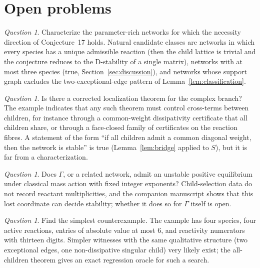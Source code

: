 \documentclass[11pt,a4paper]{article}
\theoremstyle{definition}
\theoremstyle{remark}
\newtheorem{question}[theorem]{Question}
\begin{document}
\section{Open problems}\label{sec:open}

\begin{question}
Characterize the parameter-rich networks for which the necessity direction of Conjecture~17 holds. Natural candidate classes are networks in which every species has a unique admissible reaction (then the child lattice is trivial and the conjecture reduces to the D-stability of a single matrix), networks with at most three species (true, Section~\ref{sec:discussion}), and networks whose support graph excludes the two-exceptional-edge pattern of Lemma~\ref{lem:classification}.
\end{question}

\begin{question}
Is there a corrected localization theorem for the complex branch? The example indicates that any such theorem must control cross-terms between children, for instance through a common-weight dissipativity certificate that all children share, or through a face-closed family of certificates on the reaction fibres. A statement of the form ``if all children admit a common diagonal weight, then the network is stable'' is true (Lemma~\ref{lem:bridge} applied to $S$), but it is far from a characterization.
\end{question}

\begin{question}
Does $\Gamma$, or a related network, admit an unstable positive equilibrium under classical mass action with fixed integer exponents? Child-selection data do not record reactant multiplicities, and the companion manuscript \cite{Companion2026} shows that this lost coordinate can decide stability; whether it does so for $\Gamma$ itself is open.
\end{question}

\begin{question}
Find the simplest counterexample. The example has four species, four active reactions, entries of absolute value at most $6$, and reactivity numerators with thirteen digits. Simpler witnesses with the same qualitative structure (two exceptional edges, one non-dissipative singular child) very likely exist; the all-children theorem gives an exact regression oracle for such a search.
\end{question}

\appendix
\end{document}
